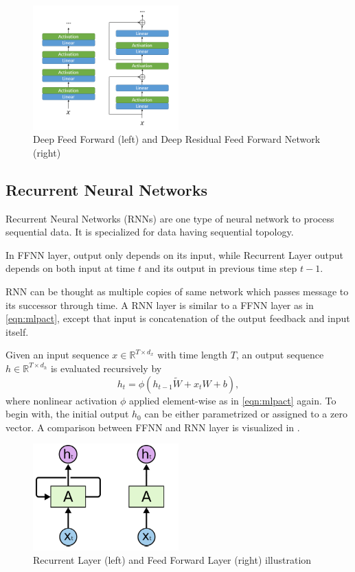 \begin{figure}
	\centering
	\includegraphics[width=0.5\textwidth]{figures/ml_theory/rffnn_ffnn.png}
	\caption{Deep Feed Forward (left) and Deep Residual Feed Forward Network (right)}
	\label{fig:rffnn_ffnn}
\end{figure}

\subsection{Recurrent Neural Networks}

Recurrent Neural Networks (RNNs) \cite{rumelhart_learning_1986} are one type of neural network to process sequential data. 
It is specialized for data having sequential topology. 

In FFNN layer, output only depends on its input, while Recurrent Layer output depends on both input at time $t$ and its output in previous time step $t-1$. 

RNN can be thought as multiple copies of same network which passes message to its successor through time. 
A RNN layer is similar to a FFNN layer as in \eqref{eqn:mlpact}, 
except that input is concatenation of the output feedback and input itself.

Given an input sequence $x \in \mathbb{R}^{T \times d_x}$ with time length $T$, an output sequence $h \in \mathbb{R}^{T \times d_h}$ is evaluated recursively by 
\begin{equation}
\label{eqn:rnnact}
h_t = \phi(h_{t-1} \tilde{W} + x_t W + b),
\end{equation}
where nonlinear activation $\phi$ applied element-wise as in \ref{eqn:mlpact} again. 
To begin with, the initial output $h_0$ can be either parametrized or assigned to a zero vector. A comparison between FFNN and RNN layer is visualized in .

\begin{figure}
	\centering
	\includegraphics[width=0.5\textwidth]{figures/ml_theory/rnn_vs_ffnn_layer.png}
	\caption{Recurrent Layer (left) and Feed Forward Layer (right) illustration~\cite{olah_understanding_2015}}
	\label{fig:rnn_vs_ffnn}
\end{figure}

